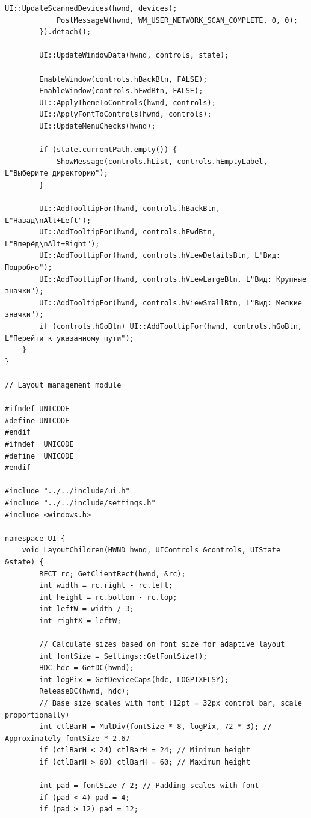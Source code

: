 \begin{lstlisting}[style=CodeListing]
            UI::UpdateScannedDevices(hwnd, devices);
            PostMessageW(hwnd, WM_USER_NETWORK_SCAN_COMPLETE, 0, 0);
        }).detach();
        
        UI::UpdateWindowData(hwnd, controls, state);
        
        EnableWindow(controls.hBackBtn, FALSE);
        EnableWindow(controls.hFwdBtn, FALSE);
        UI::ApplyThemeToControls(hwnd, controls);
        UI::ApplyFontToControls(hwnd, controls);
        UI::UpdateMenuChecks(hwnd);
        
        if (state.currentPath.empty()) {
            ShowMessage(controls.hList, controls.hEmptyLabel, L"Выберите директорию");
        }
        
        UI::AddTooltipFor(hwnd, controls.hBackBtn, L"Назад\nAlt+Left");
        UI::AddTooltipFor(hwnd, controls.hFwdBtn, L"Вперёд\nAlt+Right");
        UI::AddTooltipFor(hwnd, controls.hViewDetailsBtn, L"Вид: Подробно");
        UI::AddTooltipFor(hwnd, controls.hViewLargeBtn, L"Вид: Крупные значки");
        UI::AddTooltipFor(hwnd, controls.hViewSmallBtn, L"Вид: Мелкие значки");
        if (controls.hGoBtn) UI::AddTooltipFor(hwnd, controls.hGoBtn, L"Перейти к указанному пути");
    }
}

// Layout management module

#ifndef UNICODE
#define UNICODE
#endif
#ifndef _UNICODE
#define _UNICODE
#endif

#include "../../include/ui.h"
#include "../../include/settings.h"
#include <windows.h>

namespace UI {
    void LayoutChildren(HWND hwnd, UIControls &controls, UIState &state) {
        RECT rc; GetClientRect(hwnd, &rc);
        int width = rc.right - rc.left;
        int height = rc.bottom - rc.top;
        int leftW = width / 3;
        int rightX = leftW;
        
        // Calculate sizes based on font size for adaptive layout
        int fontSize = Settings::GetFontSize();
        HDC hdc = GetDC(hwnd);
        int logPix = GetDeviceCaps(hdc, LOGPIXELSY);
        ReleaseDC(hwnd, hdc);
        // Base size scales with font (12pt = 32px control bar, scale proportionally)
        int ctlBarH = MulDiv(fontSize * 8, logPix, 72 * 3); // Approximately fontSize * 2.67
        if (ctlBarH < 24) ctlBarH = 24; // Minimum height
        if (ctlBarH > 60) ctlBarH = 60; // Maximum height
        
        int pad = fontSize / 2; // Padding scales with font
        if (pad < 4) pad = 4;
        if (pad > 12) pad = 12;
        

\end{lstlisting}
